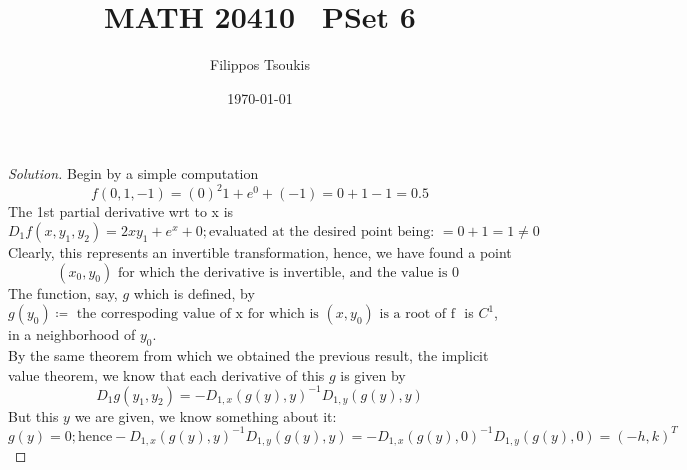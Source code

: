 \documentclass{article}
\newenvironment{problem}[2][Problem]{\begin{trivlist}
\item[\hskip \labelsep {\bfseries #1}\hskip \labelsep {\bfseries #2.}]}{\end{trivlist}}
\newenvironment{solution}{\begin{proof}[Solution]}{\end{proof}}
\begin{document}
\newcommand{\s}[0]{\sin(\theta)}
\newcommand{\cs}[0]{\cos(\theta)}
\newcommand{\spa}[0]{\hspace{1mm}}

\title{MATH 20410 \ PSet 6} %
\author{Filippos Tsoukis} %
\date{\today}
\maketitle

%
%

\begin{problem}{9.23}
\end{problem}

\begin{solution}
	Begin by a simple computation \[
		f(0,1,-1) = (0)^{2} 1 +e^{0} + (-1) = 0 + 1 - 1 = 0.5
	\]
	The 1st partial derivative wrt to x is \[
		D_{1}f(x,y_{1},y_{2}) = 2xy_{1} + e^{x} + 0; \text{evaluated at the desired point being: } = 0 + 1 = 1 \neq 0 
	\]
	Clearly, this represents an invertible transformation, hence, we have found a point \[
		(x_0, y_0) \text{ for which the derivative is invertible, and the value is 0 }
	\]
	The function, say, $g$ which is defined, by $g(y_0)\coloneqq \text{ the correspoding value of x for which is $(x, y_0)$ is a root of f }$ is $C^1$, in a neighborhood of $y_0$.
	\\
	By the same theorem from which we obtained the previous result, the implicit value theorem, we know that each derivative of this $g$ is given by \[
		D_{1}g(y_1,y_2) = -D_{1,x}(g(y), y)^{-1}D_{1, y}(g(y),y)
	\]
	But this $y$ we are given, we know something about it: \[
		g(y) = 0 ; \text{hence} -D_{1,x}(g(y), y)^{-1}D_{1, y}(g(y),y) = -D_{1,x}(g(y), 0)^{-1}D_{1, y}(g(y),0) = (-h, k)^{T }
	\]


\end{solution}
\end{document}
